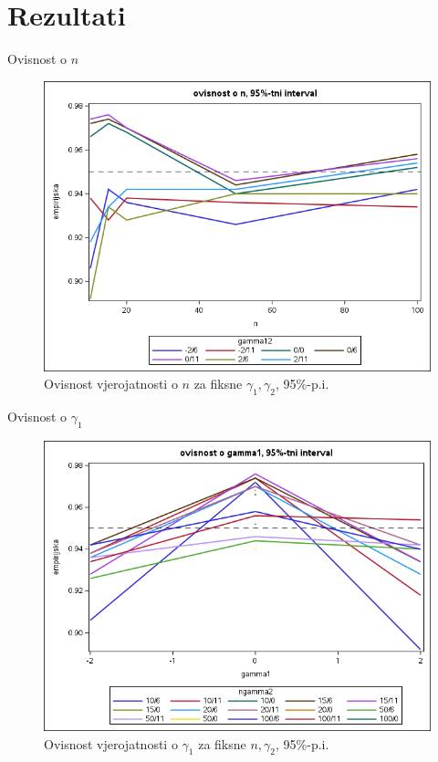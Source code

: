 \documentclass{beamer}
\begin{document}
\section{Rezultati}
\begin{frame}{Ovisnost o $n$}
	\begin{figure}
		\includegraphics[scale=0.6]{assets/grafn95.png}
		\centering
		\caption{Ovisnost vjerojatnosti o \( n \) za fiksne \( \gamma_1, \gamma_2 \), 95\%-p.i.}
		\label{grafn95}
	\end{figure}
\end{frame}

\begin{frame}{Ovisnost o $\gamma_1$}
	\begin{figure}
		\includegraphics[scale=0.6]{assets/graf195.png}
		\centering
		\caption{Ovisnost vjerojatnosti o \( \gamma_1 \) za fiksne \( n, \gamma_2 \), 95\%-p.i.}
		\label{graf195}
	\end{figure}
\end{frame}
\end{document}
